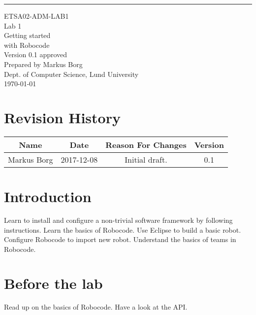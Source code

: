 \documentclass{scrreprt}
\date{}
\def\myversion{0.1 }
\begin{document}
\begin{flushright}
    \rule{16cm}{5pt}\vskip1cm
    \begin{bfseries}
    	\LARGE{ETSA02-ADM-LAB1}\\
    	\vspace{1.5cm}
        \Huge{Lab 1}\\
        \vspace{0.5cm}
        Getting started\\
        \vspace{0.5cm}
        with Robocode\\
        \vspace{1.5cm}
        \LARGE{Version \myversion approved}\\
        \vspace{1.5cm}
        Prepared by Markus Borg\\
        Dept. of Computer Science, Lund University\\
        \vspace{1.5cm}
        \today\\
    \end{bfseries}
\end{flushright}


\chapter*{Revision History}

\begin{center}
    \begin{tabular}{|c|c|c|c|}
        \hline
	    Name & Date & Reason For Changes & Version\\
        \hline
	    Markus Borg & 2017-12-08 & Initial draft. & 0.1\\
        \hline
    \end{tabular}
\end{center}

\chapter{Introduction}
Learn to install and configure a non-trivial software framework by following instructions.
Learn the basics of Robocode.
Use Eclipse to build a basic robot.
Configure Robocode to import new robot.
Understand the basics of teams in Robocode.

\chapter{Before the lab}
Read up on the basics of Robocode.
Have a look at the API.
\end{document}
